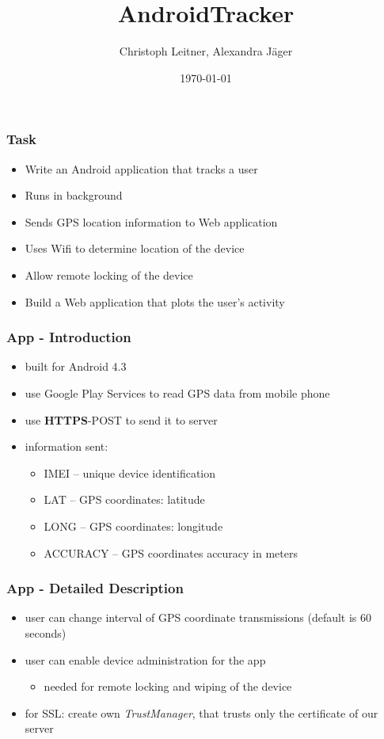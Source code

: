 \documentclass[darktitle]{beamer}
\title{AndroidTracker}
\author{Christoph Leitner, Alexandra J\"ager}
\date{\today}
\begin{document}
	\begin{frame}
		\titlepage
	\end{frame}

	\begin{frame}
		\frametitle{Task}
		\begin{itemize}
			\item Write an Android application that tracks a user
			\item Runs in background
			\item Sends GPS location information to Web application
			\item Uses Wifi to determine location of the device
			\item Allow remote locking of the device
			\item Build a Web application that plots the user's activity
		\end{itemize}
	\end{frame}

	\begin{frame}
		\frametitle{App - Introduction}
		\begin{itemize}
			\item built for Android 4.3
			\item use Google Play Services to read GPS data from mobile phone
			\item use \textbf{HTTPS}-POST to send it to server
			\item information sent:
				\begin{itemize}
					\item IMEI -- unique device identification
					\item LAT -- GPS coordinates: latitude
					\item LONG -- GPS coordinates: longitude
					\item ACCURACY -- GPS coordinates accuracy in meters
				\end{itemize}
		\end{itemize}
	\end{frame}

	\begin{frame}
		\frametitle{App - Detailed Description}
		\begin{itemize}
			\item user can change interval of GPS coordinate transmissions (default is 60 seconds)
			\item user can enable device administration for the app
				\begin{itemize}
					\item needed for remote locking and wiping of the device
				\end{itemize}
			\item for SSL: create own \emph{TrustManager}, that trusts only the certificate of our server
		\end{itemize}
	\end{frame}
\end{document}
